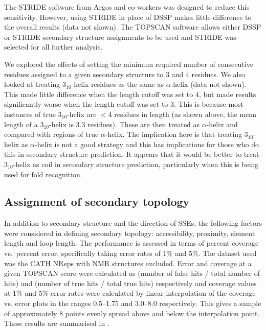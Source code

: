 \documentclass{article}
\newcommand{\htt}{\mbox{$3_{10}$}}
\begin{document}
The STRIDE software from Argos and co-workers\cite{frishman:ssassign} was
designed to reduce this sensitivity. However, using STRIDE in place of
DSSP makes little difference to the overall results (data not
shown). The TOPSCAN software allows either DSSP or STRIDE secondary
structure assignments to be used and STRIDE was selected for all
further analysis.


We explored the effects of setting the minimum required number of
consecutive residues assigned to a given secondary structure to 3 and
4 residues. We also looked at treating \htt-helix residues as the
same as $\alpha$-helix (data not shown). This made little difference
when the length cutoff was set to 4, but made results significantly
worse when the length cutoff was set to 3. This is because most
instances of true \htt-helix are $<4$ residues in length (as shown
above, the mean length of a \htt-helix is 3.3 residues). These are
then treated as $\alpha$-helix and compared with regions of true
$\alpha$-helix.  The implication here is that treating \htt-helix as
$\alpha$-helix is not a good strategy and this has implications for
those who do this in secondary structure prediction\cite[for
example]{king:combine}. It appears that it would be better to treat
\htt-helix as coil in secondary structure prediction, particularly
when this is being used for fold recognition.


\subsection{Assignment of secondary topology}
In addition to secondary structure and the direction of SSEs, the
following factors were considered in defining secondary topology:
accessibility, proximity, element length and loop length. The
performance is assessed in terms of percent coverage vs.\ percent
error, specifically taking error rates of 1\% and 5\%.  The dataset
used was the CATH NReps with NMR structures excluded. Error and
coverage at a given TOPSCAN score were calculated as (number of false
hits / total number of hits) and (number of true hits / total true
hits) respectively and coverage values at 1\% and 5\% error rates were
calculated by linear interpolation of the coverage vs. error plots in
the ranges 0.5--1.75 and 3.0--8.0 respectively. This gives a sample of
approximately 8 points evenly spread above and below the interpolation
point. These results are summarised in \tableref{\ref{tab:summary}}.
\end{document}
